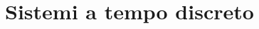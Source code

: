 \documentclass[../main.tex]{subfiles}
\begin{document}
\clearpage
\thispagestyle{empty}
\vspace*{7cm}
\section{Sistemi a tempo discreto}
\vspace*{1.5cm}
\end{document}
